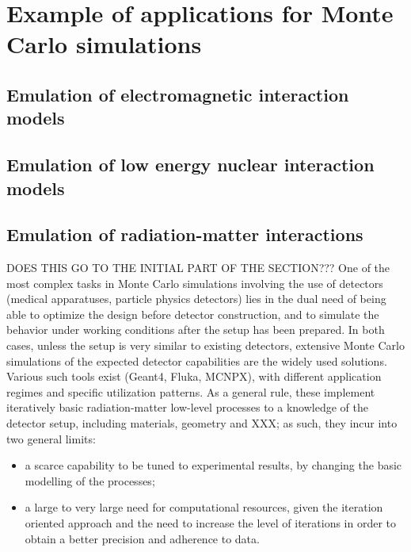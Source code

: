 \section{Example of applications for Monte Carlo simulations}
\label{sec:examples}
\subsection{Emulation of electromagnetic interaction models}
\subsection{Emulation of low energy nuclear interaction models}
\subsection{Emulation of radiation-matter interactions}
\label{subsec:interactions}

DOES THIS GO TO THE INITIAL PART OF THE SECTION???
One of the most complex tasks in Monte Carlo simulations involving the use of detectors (medical apparatuses, particle physics detectors) lies in the dual need of being able to optimize the design before detector construction, and to simulate the behavior under working conditions after the setup has been prepared.
In both cases, unless the setup is very similar to existing detectors, extensive Monte Carlo simulations of the expected detector capabilities are the widely used solutions. Various such tools exist (Geant4\cite{g4}, Fluka\cite{fluka}, MCNPX\cite{MCNPX}), with different application regimes and specific utilization patterns. As a general rule, these implement iteratively basic radiation-matter low-level processes to a knowledge of the detector setup, including materials, geometry and  XXX; as such, they incur into two general limits:
\begin{itemize}
\item a scarce capability to be tuned to experimental results, by changing the basic modelling of the processes;
\item a large to very large need for computational resources, given the iteration oriented approach and the need to increase the level of iterations in order to obtain a better precision and adherence to data.
\end{itemize}



